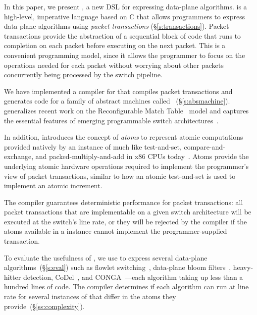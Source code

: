 In this paper, we present \pktlanguage, a new DSL for expressing data-plane
algorithms. \pktlanguage is a high-level, imperative language based on C that
allows programmers to express data-plane algorithms using {\em packet
transactions} (\S\ref{s:transactions}). Packet transactions provide the
abstraction of a sequential block of code that runs to completion on each
packet before executing on the next packet. This is a convenient programming
model, since it allows the programmer to focus on the operations needed for
each packet without worrying about other packets concurrently being processed
by the switch pipeline.

We have implemented a compiler for \pktlanguage that compiles \pktlanguage
packet transactions and generates code for a family of abstract machines called
\absmachine~(\S\ref{s:absmachine}). \absmachine generalizes recent work on the
Reconfigurable Match Table~\cite{rmt} model and captures the essential features
of emerging programmable switch architectures~\cite{rmt, xpliant, flexpipe}.

In addition, \absmachine introduces the concept of {\em atoms} to represent
atomic computations provided natively by an instance of \absmachine much like
test-and-set, compare-and-exchange, and packed-multiply-and-add in x86 CPUs
today~\cite{x86_manual}.  Atoms provide the underlying atomic hardware
operations required to implement the programmer's view of packet transactions,
similar to how an atomic test-and-set is used to implement an atomic increment.

The \pktlanguage compiler guarantees deterministic performance for packet
transactions: all packet transactions that are implementable on a given switch
architecture will be executed at the switch's line rate, or they will be
rejected by the compiler if the atoms available in a \absmachine instance cannot
implement the programmer-supplied transaction.

To evaluate the usefulness of \pktlanguage, we use \pktlanguage to express
several data-plane algorithms~(\S\ref{s:eval}) such as flowlet
switching~\cite{flowlets}, data-plane bloom filters~\cite{bloom}, heavy-hitter
detection, CoDel~\cite{codel}, and CONGA~\cite{conga}---each algorithm taking
up less than a hundred lines of \pktlanguage code.  The \pktlanguage compiler
determines if each algorithm can run at line rate for several instances of
\absmachine that differ in the atoms they provide~(\S\ref{ss:complexity}).
